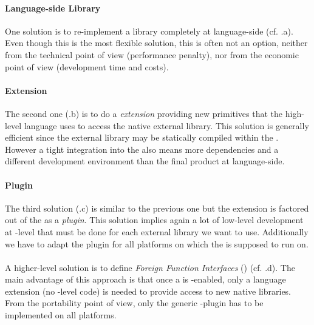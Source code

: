 \paragraph{Language-side Library}
One solution is to re-implement a library completely at language-side (cf. .a).
Even though this is the most flexible solution, this is often not an option, neither from the technical point of view (performance penalty), nor from the economic point of view (development time and costs).

\paragraph{\VM Extension}
The second one (.b) is to do a \emph{\VM extension} providing new primitives that the high-level language uses to access the native external library.
This solution is generally efficient since the external library may be statically compiled within the \VM.
However a tight integration into the \VM also means more dependencies and a different development environment than the final product at language-side.

\paragraph{\VM Plugin}
The third solution (.c) is similar to the previous one but the extension is factored out of the \VM as a \emph{plugin}.
This solution implies again a lot of low-level development at \VM-level that must be done for each external library we want to use.
Additionally we have to adapt the plugin for all platforms on which the \VM is supposed to run on.

\paragraph{\FFI}
A higher-level solution is to define \emph{Foreign Function Interfaces} (\FFIs) (cf. .d).
The main advantage of this approach is that once a \VM is \FFI-enabled, only a language extension (no \VM-level code) is needed to provide access to new native libraries.
From the portability point of view, only the generic \FFI \VM-plugin has to be implemented on all platforms.


